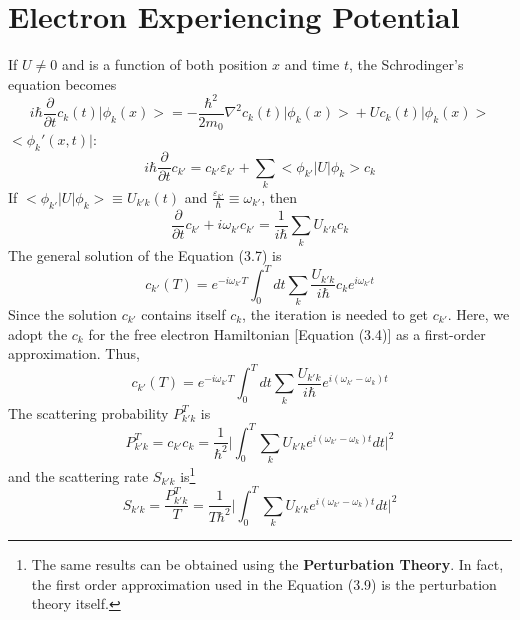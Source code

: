 \section{Electron Experiencing Potential}
If $U\neq 0$ and is a function of both position $x$ and time $t$, the Schrodinger's equation becomes \begin{equation}
    i\hbar\frac{\partial}{\partial t}c_{k}(t)\big|\phi_{k}(x)\big> = -\frac{\hbar^{2}}{2m_{0}}\nabla^{2}c_{k}(t)\big|\phi_{k}(x)\big> + Uc_{k}(t)\big|\phi_{k}(x)\big>
\end{equation} $\big<\phi_{k}'(x,t)\big|$: \begin{equation}
    i\hbar\frac{\partial}{\partial t}c_{k'} = c_{k'}\varepsilon_{k'} + \sum_{k}{\big<\phi_{k'}\big|U\big|\phi_{k}\big>c_{k}}
\end{equation} If $\big<\phi_{k'}\big|U\big|\phi_{k}\big>\equiv U_{k'k}(t)$ and $\frac{\varepsilon_{k'}}{\hbar}\equiv \omega_{k'}$, then \begin{equation}
    \boxed{\frac{\partial}{\partial t}c_{k'} + i\omega_{k'}c_{k'} = \frac{1}{i\hbar}\sum_{k}{U_{k'k}c_{k}}}
\end{equation} The general solution of the Equation (3.7) is \begin{equation}
    c_{k'}(T) = e^{-i\omega_{k'}T}\int_{0}^{T}dt\sum_{k}{\frac{U_{k'k}}{i\hbar}c_{k}e^{i\omega_{k'}t}}
\end{equation} Since the solution $c_{k'}$ contains itself $c_{k}$, the iteration is needed to get $c_{k'}$. Here, we adopt the $c_{k}$ for the free electron Hamiltonian [Equation (3.4)] as a first-order approximation. Thus, \begin{equation}
    \boxed{c_{k'}(T) = e^{-i\omega_{k'}T}\int_{0}^{T}dt\sum_{k}{\frac{U_{k'k}}{i\hbar}e^{i(\omega_{k'}-\omega_{k})t}}}
\end{equation} The scattering probability $P_{k'k}^{T}$ is \begin{equation}
    P_{k'k}^{T} = c_{k'}c_{k} = \frac{1}{\hbar^{2}}\big|\int_{0}^{T}\sum_{k}{U_{k'k}e^{i(\omega_{k'}-\omega_{k})t}}dt\big|^{2}
\end{equation} and the scattering rate $S_{k'k}$ is\footnote{The same results can be obtained using the {\bf Perturbation Theory}. In fact, the first order approximation used in the Equation (3.9) is the perturbation theory itself.} \begin{equation}
    \boxed{S_{k'k} = \frac{P_{k'k}^{T}}{T} = \frac{1}{T\hbar^{2}}\big|\int_{0}^{T}\sum_{k}{U_{k'k}e^{i(\omega_{k'}-\omega_{k})t}}dt\big|^{2}}
\end{equation}
